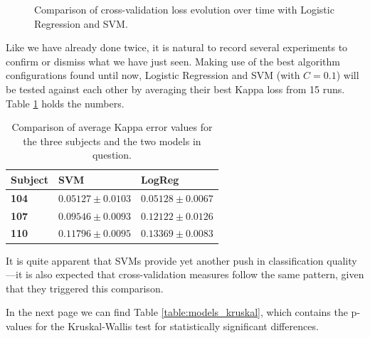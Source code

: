 \begin{figure}[bth]
\begin{center}
		\end{center}
		\caption[Cross-validation loss comparison with Logistic Regression and \acs{SVM}]{Comparison of cross-validation loss evolution over time with Logistic Regression and \acs{SVM}.}\label{gfx:fs_models_cv}

	\end{figure}

	Like we have already done twice, it is natural to record several experiments to confirm or dismiss what we have just seen. Making use of the best algorithm configurations found until now, Logistic Regression and \acs{SVM} (with $C = 0.1$) will be tested against each other by averaging their best Kappa loss from 15 runs. Table \ref{table:models_kappa} holds the numbers.

	\vspace{0.3cm}

	\begin{table}[h]

        \centering
        \setlength\arrayrulewidth{0.8pt}

        \begin{tabular}{| >{\centering\arraybackslash}m{0.5in} | >{\centering\arraybackslash}m{1.1in} | >{\centering\arraybackslash}m{1.1in} |}

            \hline
            \rowcolor{RoyalBlue}
            \textbf{Subject} & \textbf{SVM} & \textbf{LogReg} \\
            \hline
            \textbf{104} & $0.05127 \pm 0.0103$ & $0.05128 \pm 0.0067$ \\
            \hline
            \textbf{107} & $0.09546 \pm 0.0093$ & $0.12122 \pm 0.0126$ \\
            \hline
            \textbf{110} & $0.11796 \pm 0.0095$ & $0.13369 \pm 0.0083$ \\
            \hline

        \end{tabular}

        \caption{Comparison of average Kappa error values for the three subjects and the two models in question.}\label{table:models_kappa}

    \end{table}

    It is quite apparent that \acs{SVM}s provide yet another push in classification quality---it is also expected that cross-validation measures follow the same pattern, given that they triggered this comparison.

    In the next page we can find Table \ref{table:models_kruskal}, which contains the p-values for the Kruskal-Wallis test for statistically significant differences.

